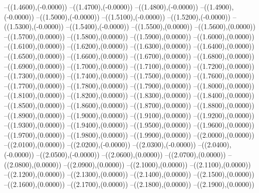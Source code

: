 {	--({\sx*(1.4600)},{\sy*(-0.0000)})
	--({\sx*(1.4700)},{\sy*(-0.0000)})
	--({\sx*(1.4800)},{\sy*(-0.0000)})
	--({\sx*(1.4900)},{\sy*(-0.0000)})
	--({\sx*(1.5000)},{\sy*(-0.0000)})
	--({\sx*(1.5100)},{\sy*(-0.0000)})
	--({\sx*(1.5200)},{\sy*(-0.0000)})
	--({\sx*(1.5300)},{\sy*(-0.0000)})
	--({\sx*(1.5400)},{\sy*(-0.0000)})
	--({\sx*(1.5500)},{\sy*(0.0000)})
	--({\sx*(1.5600)},{\sy*(0.0000)})
	--({\sx*(1.5700)},{\sy*(0.0000)})
	--({\sx*(1.5800)},{\sy*(0.0000)})
	--({\sx*(1.5900)},{\sy*(0.0000)})
	--({\sx*(1.6000)},{\sy*(0.0000)})
	--({\sx*(1.6100)},{\sy*(0.0000)})
	--({\sx*(1.6200)},{\sy*(0.0000)})
	--({\sx*(1.6300)},{\sy*(0.0000)})
	--({\sx*(1.6400)},{\sy*(0.0000)})
	--({\sx*(1.6500)},{\sy*(0.0000)})
	--({\sx*(1.6600)},{\sy*(0.0000)})
	--({\sx*(1.6700)},{\sy*(0.0000)})
	--({\sx*(1.6800)},{\sy*(0.0000)})
	--({\sx*(1.6900)},{\sy*(0.0000)})
	--({\sx*(1.7000)},{\sy*(0.0000)})
	--({\sx*(1.7100)},{\sy*(0.0000)})
	--({\sx*(1.7200)},{\sy*(0.0000)})
	--({\sx*(1.7300)},{\sy*(0.0000)})
	--({\sx*(1.7400)},{\sy*(0.0000)})
	--({\sx*(1.7500)},{\sy*(0.0000)})
	--({\sx*(1.7600)},{\sy*(0.0000)})
	--({\sx*(1.7700)},{\sy*(0.0000)})
	--({\sx*(1.7800)},{\sy*(0.0000)})
	--({\sx*(1.7900)},{\sy*(0.0000)})
	--({\sx*(1.8000)},{\sy*(0.0000)})
	--({\sx*(1.8100)},{\sy*(0.0000)})
	--({\sx*(1.8200)},{\sy*(0.0000)})
	--({\sx*(1.8300)},{\sy*(0.0000)})
	--({\sx*(1.8400)},{\sy*(0.0000)})
	--({\sx*(1.8500)},{\sy*(0.0000)})
	--({\sx*(1.8600)},{\sy*(0.0000)})
	--({\sx*(1.8700)},{\sy*(0.0000)})
	--({\sx*(1.8800)},{\sy*(0.0000)})
	--({\sx*(1.8900)},{\sy*(0.0000)})
	--({\sx*(1.9000)},{\sy*(0.0000)})
	--({\sx*(1.9100)},{\sy*(0.0000)})
	--({\sx*(1.9200)},{\sy*(0.0000)})
	--({\sx*(1.9300)},{\sy*(0.0000)})
	--({\sx*(1.9400)},{\sy*(0.0000)})
	--({\sx*(1.9500)},{\sy*(0.0000)})
	--({\sx*(1.9600)},{\sy*(0.0000)})
	--({\sx*(1.9700)},{\sy*(0.0000)})
	--({\sx*(1.9800)},{\sy*(0.0000)})
	--({\sx*(1.9900)},{\sy*(0.0000)})
	--({\sx*(2.0000)},{\sy*(0.0000)})
	--({\sx*(2.0100)},{\sy*(0.0000)})
	--({\sx*(2.0200)},{\sy*(-0.0000)})
	--({\sx*(2.0300)},{\sy*(-0.0000)})
	--({\sx*(2.0400)},{\sy*(-0.0000)})
	--({\sx*(2.0500)},{\sy*(-0.0000)})
	--({\sx*(2.0600)},{\sy*(0.0000)})
	--({\sx*(2.0700)},{\sy*(0.0000)})
	--({\sx*(2.0800)},{\sy*(0.0000)})
	--({\sx*(2.0900)},{\sy*(0.0000)})
	--({\sx*(2.1000)},{\sy*(0.0000)})
	--({\sx*(2.1100)},{\sy*(0.0000)})
	--({\sx*(2.1200)},{\sy*(0.0000)})
	--({\sx*(2.1300)},{\sy*(0.0000)})
	--({\sx*(2.1400)},{\sy*(0.0000)})
	--({\sx*(2.1500)},{\sy*(0.0000)})
	--({\sx*(2.1600)},{\sy*(0.0000)})
	--({\sx*(2.1700)},{\sy*(0.0000)})
	--({\sx*(2.1800)},{\sy*(0.0000)})
	--({\sx*(2.1900)},{\sy*(0.0000)})
}

